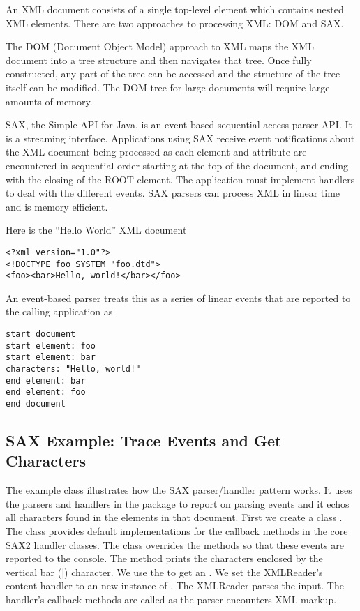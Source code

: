 An XML document consists of a single top-level element which contains
nested XML elements.   There are two approaches to processing XML:
DOM and SAX.

The DOM (Document Object Model) approach to XML maps the XML document into a tree structure
and then navigates that tree.  
Once fully constructed, any part of the tree can be accessed and the structure of 
the tree itself can be modified.
The DOM tree for large documents will require large amounts of memory.

SAX, the Simple API for Java, is an event-based sequential access
parser API.  It is a streaming interface.  Applications using SAX
receive event notifications about the XML document being processed as each
element and attribute are encountered in sequential order starting at the
top of the document, and ending with the closing of the ROOT
element. The application must implement handlers to deal with the different events.
SAX parsers can process XML in
linear time and is memory efficient.

Here is the ``Hello World'' XML document
\begin{verbatim}
<?xml version="1.0"?>
<!DOCTYPE foo SYSTEM "foo.dtd">
<foo><bar>Hello, world!</bar></foo>
\end{verbatim}

An event-based parser treats this as a series of linear events
that are reported to the calling application as
\begin{verbatim}
start document
start element: foo
start element: bar
characters: "Hello, world!"
end element: bar
end element: foo
end document
\end{verbatim}

\subsection{SAX Example: Trace Events and Get Characters}

The example class  illustrates 
how the SAX parser/handler pattern works.
It uses the parsers and handlers in the
 package to report on parsing events and it
echos all characters found in the elements in that document.
%
% 
First we create a class .
%
%
The class  provides default implementations
for the callback methods in the core SAX2 handler classes.
The  class overrides the methods 
so that these events are reported to the console.
The  method prints the characters enclosed by
the vertical bar (|) character.
%
%
We use the  to get an .
We set the XMLReader's content handler to an new instance
of .
The XMLReader parses the input.
The handler's callback methods are called as the parser encounters
XML markup.

